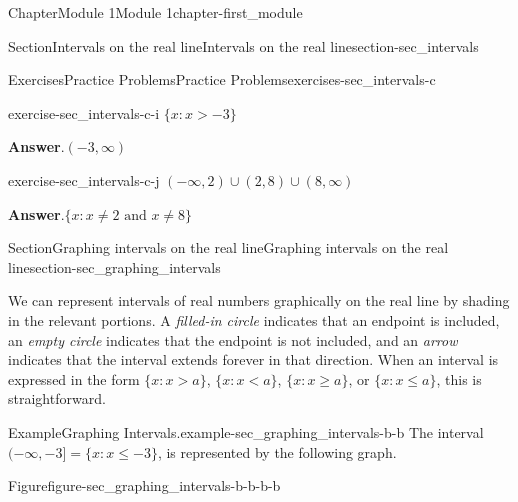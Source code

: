 \documentclass[oneside,10pt,]{book}
\newcommand{\blocktitlefont}{\relax}
\newcommand{\lt}{<}
\begin{document}
\begin{chapterptx}{Chapter}{Module 1}{}{Module 1}{}{}{chapter-first_module}
\begin{sectionptx}{Section}{Intervals on the real line}{}{Intervals on the real line}{}{}{section-sec_intervals}
\begin{exercises-subsection-numberless}{Exercises}{Practice Problems}{}{Practice Problems}{}{}{exercises-sec_intervals-c}
\begin{divisionexercise}{7}{}{}{exercise-sec_intervals-c-i}
\(\{x : x > -3\}\)\par\smallskip%
\noindent\textbf{\blocktitlefont Answer}.\hypertarget{answer-sec_intervals-c-i-b}{}\quad{}\((-3,\infty)\)\end{divisionexercise}%
\begin{divisionexercise}{8}{}{}{exercise-sec_intervals-c-j}%
\((-\infty,2)\cup(2,8)\cup(8,\infty)\)\par\smallskip%
\noindent\textbf{\blocktitlefont Answer}.\hypertarget{answer-sec_intervals-c-j-b}{}\quad{}\(\{x : x\neq 2 \mbox{ and } x\neq 8\}\)\end{divisionexercise}%
\end{exercises-subsection-numberless}
\end{sectionptx}
%
%
\typeout{************************************************}
\typeout{************************************************}
%
\begin{sectionptx}{Section}{Graphing intervals on the real line}{}{Graphing intervals on the real line}{}{}{section-sec_graphing_intervals}
\begin{introduction}{}%
We can represent intervals of real numbers graphically on the real line by shading in the relevant portions.  A \emph{filled-in circle} indicates that an endpoint is included, an \emph{empty circle} indicates that the endpoint is not included, and an \emph{arrow} indicates that the interval extends forever in that direction.  When an interval is expressed in the form \(\{x : x>a\}\), \(\{x : x\lt a\}\), \(\{x : x\geq a\}\), or \(\{x : x\leq a\}\), this is straightforward.%
\begin{example}{Example}{Graphing Intervals.}{example-sec_graphing_intervals-b-b}%
The interval \((-\infty,-3]=\{x: x \leq -3\}\), is represented by the following graph.%
\begin{figureptx}{Figure}{}{figure-sec_graphing_intervals-b-b-b-b}{}%
\begin{image}{0}{1}{0}{}%
%
\end{image}%

\end{figureptx}
\end{example}
\end{introduction}
\end{sectionptx}
\end{chapterptx}
\end{document}
